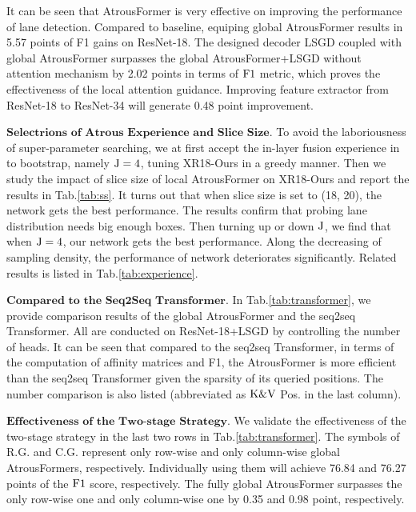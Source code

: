 \documentclass[preprint,12pt,review]{elsarticle}
\begin{document}
It can be seen that AtrousFormer is very effective on improving the performance of lane detection. Compared to baseline, equiping global AtrousFormer results in 5.57 points of F1 gains on ResNet-18. The designed decoder LSGD coupled with global AtrousFormer surpasses the global AtrousFormer+LSGD without attention mechanism by 2.02 points in terms of $\rm F1$ metric, which proves the effectiveness of the local attention guidance. Improving feature extractor from ResNet-18 to ResNet-34 will generate 0.48 point improvement. 

$\textbf{Selectrions of Atrous Experience and Slice Size.}$ To avoid the laboriousness of super-parameter searching, we at first accept the in-layer fusion experience in \cite{resa} to bootstrap, namely $\rm{J}=4$, tuning XR18-Ours in a greedy manner. Then we study the impact of slice size of local AtrousFormer on XR18-Ours and report the results in Tab.\ref{tab:ss}. It turns out that when slice size is set to (18, 20), the network gets the best performance. The results confirm that probing lane distribution needs big enough boxes. Then turning up or down $\rm{J}$, we find that when $\rm{J}=4$, our network gets the best performance. Along the decreasing of sampling density, the performance of network deteriorates significantly. Related results is listed in Tab.\ref{tab:experience}.

$\textbf{Compared to the Seq2Seq Transformer.}$ In Tab.\ref{tab:transformer}, we provide comparison results of the global AtrousFormer and the seq2seq Transformer. All are conducted on ResNet-18+LSGD by controlling the number of heads. It can be seen that compared to the seq2seq Transformer, in terms of the computation of affinity matrices and F1, the AtrousFormer is more efficient than the seq2seq Transformer given the sparsity of its queried positions. The number comparison is also listed (abbreviated as $\rm K\&V$ Pos. in the last column). 

$\textbf{Effectiveness of the Two-stage Strategy.}$ We validate the effectiveness of the two-stage strategy in the last two rows in Tab.\ref{tab:transformer}. The symbols of R.G. and C.G. represent only row-wise and only column-wise global AtrousFormers, respectively. Individually using them will achieve 76.84 and 76.27 points of the $\rm F1$ score, respectively. The fully global AtrousFormer surpasses the only row-wise one and only column-wise one by 0.35 and 0.98 point, respectively.
\end{document}
